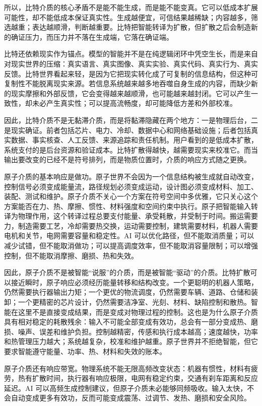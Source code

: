 所以，比特介质的核心矛盾不是能不能生成，而是能不能变真。它可以低成本扩展可能性，却不能低成本保证真实性。生成越便宜，可信结果越稀缺；内容越多，筛选越重；表达越顺滑，判断越重要。比特把智能转译为扩散，但扩散之后会制造新的确证压力，而压力并不落在生成端，它落在确证端。

比特还依赖现实作为锚点。模型的智能并不是在纯逻辑闭环中凭空生长，而是来自对现实世界的压缩：真实语言、真实图像、真实实验、真实代码、真实行为、真实反馈。比特世界看起来轻，是因为它把现实转化成了可复制的信息结构，但这种可复制性不能脱离现实来源。若信息系统越来越多地吞噬自身生成的内容，而缺少新的现实摩擦和外部反馈，它会变得越来越顺滑，也可能越来越封闭\cite{shumailov2024ai}。它可以产生一致性，却未必产生真实性；可以提高流畅度，却可能降低方差和外部校准。

因此，比特介质不是无黏滞介质，而是将黏滞隐藏在两个地方：一是物理后台，二是现实确证。前者包括芯片、电力、冷却、数据中心和网络基础设施；后者包括真实数据、事实核查、人工反馈、来源追踪和责任机制。用户看到的是低成本扩散，系统支付的是后台资源和验证成本。比特扩散得越快，越需要现实来校准它。而当输出要改变的已经不是符号排列，而是物质位置时，介质的响应方式随之更换。


原子介质的基本响应是做功。原子世界不会因为一个信息结构被生成就自动改变，控制信号必须变成能量流，路径规划必须变成运动，设计图必须变成材料、加工、装配、测试和维护。原子介质不关心一个方案在符号空间中多优雅，它只关心这个方案能否在力、热、摩擦、惯性、材料强度和空间约束中执行。原子把智能输入转译为物理作用，这个转译过程总要支付能量、承受耗散，并受制于时间。搬运需要力，制造需要工艺，冷却需要热交换，运动需要控制，建筑需要材料，机器人需要电机和关节，电网需要容量和稳定性。AI 可以优化路径，但不能取消质量；可以减少试错，但不能取消做功；可以提高调度效率，但不能取消容量限制；可以增强控制，但不能取消摩擦、磨损、热和失效。

因此，原子介质不是被智能“说服”的介质，而是被智能“驱动”的介质。比特扩散可以接近瞬时，原子响应必须经历能量转移和结构改变。一个更聪明的机器人策略，仍然需要执行器输出力矩；一个更优的物流调度，仍然需要车辆、道路、仓储和装卸；一个更精密的芯片设计，仍然需要洁净室、光刻、材料、缺陷控制和散热。智能在这里不是直接变成结果，而是变成对物理过程的控制。这也是为什么原子介质具有相对稳定的耗散残余：输入不可能全部变成有效功，总会有一部分变成热、磨损、噪声、误差和维护负担。控制越精密，传感和执行成本越高；速度越快，功率和热管理压力越大；系统越复杂，校准和维护越重。原子世界并不拒绝智能，但它要求智能遵守能量、功率、热、材料和失效的账本。

原子介质还有响应带宽。物理系统不能无限高频改变状态：机器有惯性，材料有疲劳，热有扩散时间，执行器有响应极限，电网有稳定约束，交通有刹车距离和反应延迟。AI 可以高频生成控制建议，但原子介质未必能够同频吸收。输入太快，不会自动变成更多有效功，反而可能变成震荡、过调节、发热、磨损和安全风险。

